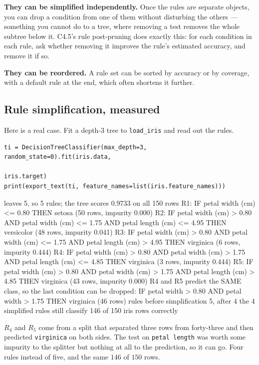 \documentclass[11pt]{article}
\begin{document}
\textbf{They can be simplified independently.} Once the rules are separate
objects, you can drop a condition from one of them without disturbing the
others --- something you cannot do to a tree, where removing a test removes the
whole subtree below it. C4.5's rule post-pruning does exactly this: for each
condition in each rule, ask whether removing it improves the rule's estimated
accuracy, and remove it if so.

\textbf{They can be reordered.} A rule set can be sorted by accuracy or by
coverage, with a default rule at the end, which often shortens it further.

\subsection{Rule simplification, measured}

Here is a real case. Fit a depth-3 tree to \texttt{load\_iris} and read out
the rules.

\begin{lstlisting}
ti = DecisionTreeClassifier(max_depth=3, random_state=0).fit(iris.data,
                                                            iris.target)
print(export_text(ti, feature_names=list(iris.feature_names)))
\end{lstlisting}
\begin{codeout}
leaves 5, so 5 rules; the tree scores 0.9733 on all 150 rows
R1: IF petal width (cm) <= 0.80 THEN setosa   (50 rows, impurity 0.000)
R2: IF petal width (cm) > 0.80 AND petal width (cm) <= 1.75
    AND petal length (cm) <= 4.95 THEN versicolor   (48 rows, impurity 0.041)
R3: IF petal width (cm) > 0.80 AND petal width (cm) <= 1.75
    AND petal length (cm) > 4.95 THEN virginica   (6 rows, impurity 0.444)
R4: IF petal width (cm) > 0.80 AND petal width (cm) > 1.75
    AND petal length (cm) <= 4.85 THEN virginica   (3 rows, impurity 0.444)
R5: IF petal width (cm) > 0.80 AND petal width (cm) > 1.75
    AND petal length (cm) > 4.85 THEN virginica   (43 rows, impurity 0.000)
R4 and R5 predict the SAME class, so the last condition can be dropped:
   IF petal width > 0.80 AND petal width > 1.75 THEN virginica  (46 rows)
rules before simplification 5, after 4
the 4 simplified rules still classify 146 of 150 iris rows correctly
\end{codeout}

$R_4$ and $R_5$ come from a split that separated three rows from forty-three
and then predicted \texttt{virginica} on both sides. The test on
\texttt{petal length} was worth some impurity to the splitter but nothing at
all to the prediction, so it can go. Four rules instead of five, and the same
$146$ of $150$ rows.
\end{document}
